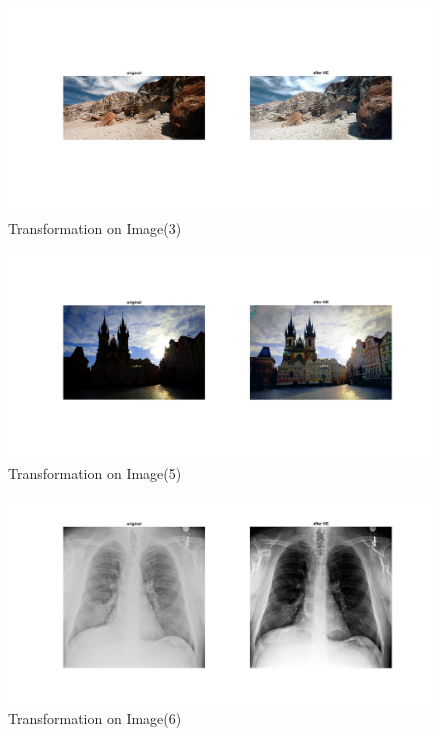 \documentclass[12pt, a4paper]{article}
\begin{document}
\begin{figure}[H]
    \centering
    \includegraphics[width=\textwidth]{c3.jpg}
    \vspace*{-90pt}
    \caption{Transformation on Image(3)}
    \label{fig:3.3}
\end{figure}
\renewcommand{\thefigure}{3.5}
\begin{figure}[H]
    \centering
    \vspace*{-30pt}
    \includegraphics[width=\textwidth]{c5.jpg}
    \vspace*{-75pt}
    \caption{Transformation on Image(5)}
    \label{fig:3.5}
\end{figure}
\renewcommand{\thefigure}{3.6}
\begin{figure}[H]
    \centering
    \vspace*{-30pt}
    \includegraphics[width=\textwidth]{c6.jpg}
    \vspace*{-50pt}
    \caption{Transformation on Image(6)}
    \label{fig:3.6}
\end{figure}
\end{document}
